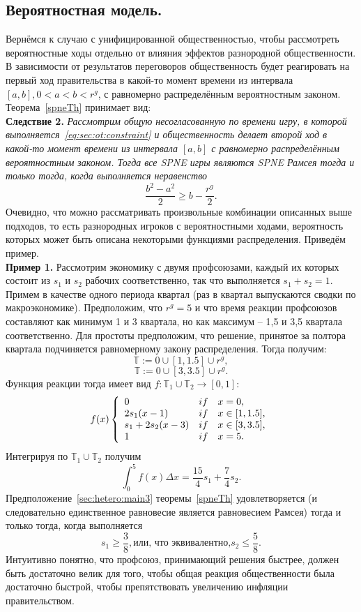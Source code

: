 \subsection{Вероятностная модель.}
Вернёмся к случаю с унифицированной общественностью, чтобы рассмотреть вероятностные ходы отдельно от влияния эффектов разнородной общественности. В зависимости от результатов переговоров общественность будет реагировать на первый ход правительства в какой-то момент времени из интервала $[a,b], 0< a < b < r^g$, с равномерно распределённым вероятностным законом. Теорема~\ref{spneTh} принимает вид:\\
\textbf{Следствие 2.} \textit{Рассмотрим общую несогласованную по времени игру, в которой выполняется~\eqref{eq:sec:ot:constraint} и общественность делает второй ход в какой-то момент времени из интервала $[a,b]$ с равномерно распределённым вероятностным законом. Тогда все SPNE игры являются SPNE Рамсея тогда и только тогда, когда выполняется неравенство
\begin{equation}
\label{sec:hetero:main5}
\frac{b^2 - a^2}{2} \geq b - \frac{r^g}{2} .
\end{equation}
}
Очевидно, что можно рассматривать произвольные комбинации описанных выше подходов, то есть разнородных игроков с вероятностными ходами, вероятность которых может быть описана некоторыми функциями распределения. Приведём пример.\\
\textbf{Пример 1.} Рассмотрим экономику с двумя профсоюзами, каждый их которых состоит из $s_1$ и $s_2$ рабочих соответственно, так что выполняется $s_1 + s_2 = 1$. Примем в качестве одного периода квартал (раз в квартал выпускаются сводки по макроэкономике). Предположим, что $r^g = 5$ и что время реакции профсоюзов составляют как минимум  1 и 3 квартала, но как максимум -- 1,5 и 3,5 квартала соответственно. Для простоты предположим, что решение, принятое за полтора квартала подчиняется равномерному закону распределения. Тогда получим:
$$ \mathbb{T} :={0} \cup [1, 1.5] \cup {r^g} ,$$
$$ \mathbb{T} :={0} \cup [3, 3.5] \cup {r^g} .$$
Функция реакции тогда имеет вид $f : \mathbb{T}_1\cup\mathbb{T}_2\to[0,1]$:
$$ f(x)\left\{  
\begin{array}{l c l}
0 & if & x = 0,\\
2s_1(x - 1) & if & x \in [1,1.5],\\
s_1 + 2s_2(x - 3) & if & x \in [3,3.5],\\
1 & if & x = 5.
\end{array} 
\right.$$
Интегрируя по $\mathbb{T}_1\cup\mathbb{T}_2$ получим
$$ \int_0^5 f(x) \Delta x = \frac{15}{4}s_1 + \frac{7}{4}s_2. $$
Предположение~\eqref{sec:hetero:main3} теоремы~\ref{spneTh} удовлетворяется (и следовательно единственное равновесие является равновесием Рамсея) тогда и только тогда, когда выполняется
$$ s_1 \geq \frac{3}{8}, \text{или, что эквивалентно,} s_2 \leq \frac{5}{8}. $$
Интуитивно понятно, что профсоюз, принимающий решения быстрее, должен быть достаточно велик для того, чтобы общая реакция общественности была достаточно быстрой, чтобы препятствовать увеличению инфляции правительством.